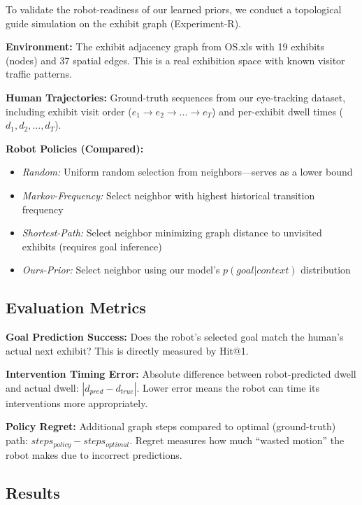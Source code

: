 \documentclass[letterpaper]{article}
\begin{document}
To validate the robot-readiness of our learned priors, we conduct a topological guide simulation on the exhibit graph (Experiment-R).

\textbf{Environment:} The exhibit adjacency graph from OS.xls with 19 exhibits (nodes) and 37 spatial edges. This is a real exhibition space with known visitor traffic patterns.

\textbf{Human Trajectories:} Ground-truth sequences from our eye-tracking dataset, including exhibit visit order ($e_1 \rightarrow e_2 \rightarrow ... \rightarrow e_T$) and per-exhibit dwell times ($d_1, d_2, ..., d_T$).

\textbf{Robot Policies (Compared):}
\begin{itemize}
    \item \textit{Random:} Uniform random selection from neighbors—serves as a lower bound
    \item \textit{Markov-Frequency:} Select neighbor with highest historical transition frequency
    \item \textit{Shortest-Path:} Select neighbor minimizing graph distance to unvisited exhibits (requires goal inference)
    \item \textit{Ours-Prior:} Select neighbor using our model's $p(goal|context)$ distribution
\end{itemize}

\subsection{Evaluation Metrics}

\textbf{Goal Prediction Success:} Does the robot's selected goal match the human's actual next exhibit? This is directly measured by Hit@1.

\textbf{Intervention Timing Error:} Absolute difference between robot-predicted dwell and actual dwell: $|d_{pred} - d_{true}|$. Lower error means the robot can time its interventions more appropriately.

\textbf{Policy Regret:} Additional graph steps compared to optimal (ground-truth) path: $steps_{policy} - steps_{optimal}$. Regret measures how much ``wasted motion'' the robot makes due to incorrect predictions.

\subsection{Results}
\end{document}
